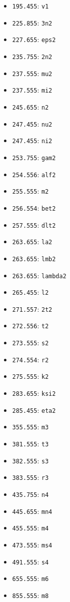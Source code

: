 \begin{itemize}
\item \verb|195.455|: \verb|v1|   \item \verb|225.855|: \verb|3n2|     \item \verb|227.655|: \verb|eps2|
\item \verb|235.755|: \verb|2n2|  \item \verb|237.555|: \verb|mu2|     \item \verb|237.555|: \verb|mi2|
\item \verb|245.655|: \verb|n2|   \item \verb|247.455|: \verb|nu2|     \item \verb|247.455|: \verb|ni2|
\item \verb|253.755|: \verb|gam2| \item \verb|254.556|: \verb|alf2|    \item \verb|255.555|: \verb|m2|
\item \verb|256.554|: \verb|bet2| \item \verb|257.555|: \verb|dlt2|    \item \verb|263.655|: \verb|la2|
\item \verb|263.655|: \verb|lmb2| \item \verb|263.655|: \verb|lambda2| \item \verb|265.455|: \verb|l2|
\item \verb|271.557|: \verb|2t2|  \item \verb|272.556|: \verb|t2|      \item \verb|273.555|: \verb|s2|
\item \verb|274.554|: \verb|r2|   \item \verb|275.555|: \verb|k2|      \item \verb|283.655|: \verb|ksi2|
\item \verb|285.455|: \verb|eta2| \item \verb|355.555|: \verb|m3|      \item \verb|381.555|: \verb|t3|
\item \verb|382.555|: \verb|s3|   \item \verb|383.555|: \verb|r3|      \item \verb|435.755|: \verb|n4|
\item \verb|445.655|: \verb|mn4|  \item \verb|455.555|: \verb|m4|      \item \verb|473.555|: \verb|ms4|
\item \verb|491.555|: \verb|s4|   \item \verb|655.555|: \verb|m6|      \item \verb|855.555|: \verb|m8|
\end{itemize}

